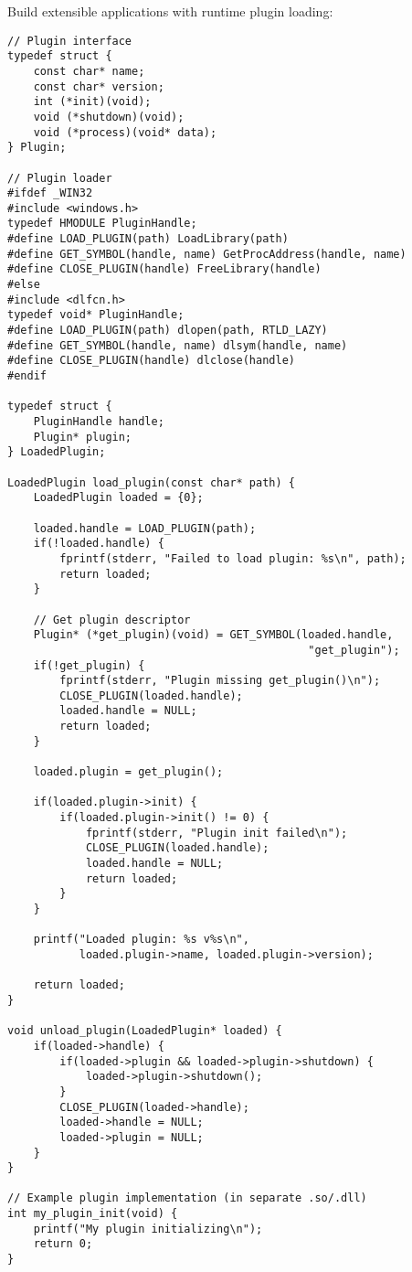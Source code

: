 \begin{description}[style=nextline,leftmargin=0pt]
Build extensible applications with runtime plugin loading:

\begin{lstlisting}
// Plugin interface
typedef struct {
    const char* name;
    const char* version;
    int (*init)(void);
    void (*shutdown)(void);
    void (*process)(void* data);
} Plugin;

// Plugin loader
#ifdef _WIN32
#include <windows.h>
typedef HMODULE PluginHandle;
#define LOAD_PLUGIN(path) LoadLibrary(path)
#define GET_SYMBOL(handle, name) GetProcAddress(handle, name)
#define CLOSE_PLUGIN(handle) FreeLibrary(handle)
#else
#include <dlfcn.h>
typedef void* PluginHandle;
#define LOAD_PLUGIN(path) dlopen(path, RTLD_LAZY)
#define GET_SYMBOL(handle, name) dlsym(handle, name)
#define CLOSE_PLUGIN(handle) dlclose(handle)
#endif

typedef struct {
    PluginHandle handle;
    Plugin* plugin;
} LoadedPlugin;

LoadedPlugin load_plugin(const char* path) {
    LoadedPlugin loaded = {0};

    loaded.handle = LOAD_PLUGIN(path);
    if(!loaded.handle) {
        fprintf(stderr, "Failed to load plugin: %s\n", path);
        return loaded;
    }

    // Get plugin descriptor
    Plugin* (*get_plugin)(void) = GET_SYMBOL(loaded.handle,
                                              "get_plugin");
    if(!get_plugin) {
        fprintf(stderr, "Plugin missing get_plugin()\n");
        CLOSE_PLUGIN(loaded.handle);
        loaded.handle = NULL;
        return loaded;
    }

    loaded.plugin = get_plugin();

    if(loaded.plugin->init) {
        if(loaded.plugin->init() != 0) {
            fprintf(stderr, "Plugin init failed\n");
            CLOSE_PLUGIN(loaded.handle);
            loaded.handle = NULL;
            return loaded;
        }
    }

    printf("Loaded plugin: %s v%s\n",
           loaded.plugin->name, loaded.plugin->version);

    return loaded;
}

void unload_plugin(LoadedPlugin* loaded) {
    if(loaded->handle) {
        if(loaded->plugin && loaded->plugin->shutdown) {
            loaded->plugin->shutdown();
        }
        CLOSE_PLUGIN(loaded->handle);
        loaded->handle = NULL;
        loaded->plugin = NULL;
    }
}

// Example plugin implementation (in separate .so/.dll)
int my_plugin_init(void) {
    printf("My plugin initializing\n");
    return 0;
}


\end{lstlisting}
\end{description}
